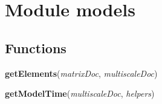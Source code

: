 %
%
%


\section{Module models}

    \label{models}


  \subsection{Functions}

    \label{models:getElements}

    \vspace{0.5ex}

\hspace{.8\funcindent}\begin{boxedminipage}{\funcwidth}

    \raggedright \textbf{getElements}(\textit{matrixDoc}, \textit{multiscaleDoc})

\setlength{\parskip}{2ex}
\setlength{\parskip}{1ex}
    \end{boxedminipage}

    \label{models:getModelTime}

    \vspace{0.5ex}

\hspace{.8\funcindent}\begin{boxedminipage}{\funcwidth}

    \raggedright \textbf{getModelTime}(\textit{multiscaleDoc}, \textit{helpers})

\setlength{\parskip}{2ex}
\setlength{\parskip}{1ex}
    \end{boxedminipage}

